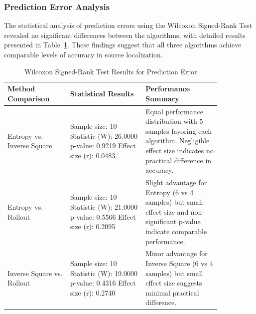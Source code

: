\documentclass[../report.tex]{subfiles}
\begin{document}
    \subsubsection{Prediction Error Analysis}
    The statistical analysis of prediction errors using the Wilcoxon Signed-Rank Test revealed no significant differences between the algorithms, with detailed results presented in Table~\ref{tab:wilcoxon_prediction_results}. These findings suggest that all three algorithms achieve comparable levels of accuracy in source localization.
    \begin{table}[ht]
        \caption{Wilcoxon Signed-Rank Test Results for Prediction Error}
        \label{tab:wilcoxon_prediction_results}
        \centering
        \begin{tabular}{|p{0.25\linewidth}|p{0.3\linewidth}|p{0.3\linewidth}|}
        \hline
        \rowcolor{gray!10} 
        Method Comparison & Statistical Results & Performance Summary \\
        \hline
        Entropy vs. Inverse Square & 
        Sample size: 10 \newline
        Statistic (W): 26.0000 \newline
        p-value: 0.9219 \newline
        Effect size (r): 0.0483 & 
        Equal performance distribution with 5 samples favoring each algorithm. Negligible effect size indicates no practical difference in accuracy. \\
        \hline
        Entropy vs. Rollout & 
        Sample size: 10 \newline
        Statistic (W): 21.0000 \newline
        p-value: 0.5566 \newline
        Effect size (r): 0.2095 & 
        Slight advantage for Entropy (6 vs 4 samples) but small effect size and non-significant p-value indicate comparable performance. \\
        \hline
        Inverse Square vs. Rollout & 
        Sample size: 10 \newline
        Statistic (W): 19.0000 \newline
        p-value: 0.4316 \newline
        Effect size (r): 0.2740 & 
        Minor advantage for Inverse Square (6 vs 4 samples) but small effect size suggests minimal practical difference. \\
        \hline
        \end{tabular}
    \end{table}
\end{document}
